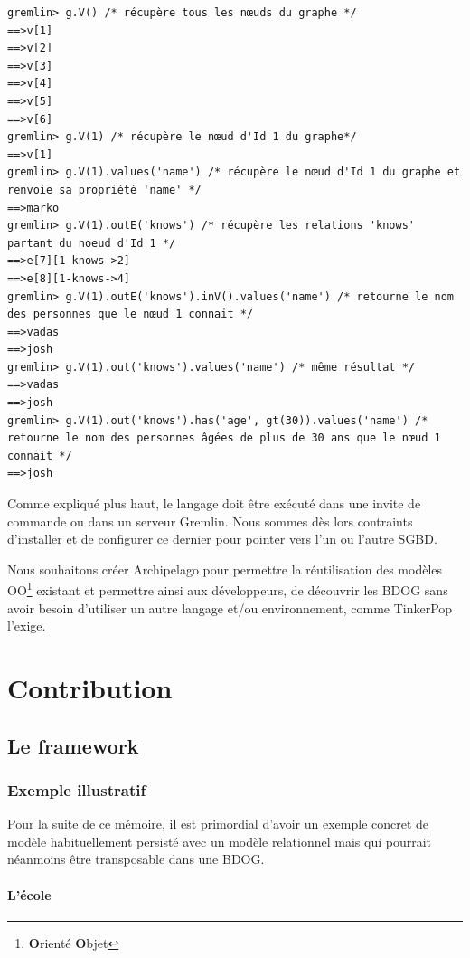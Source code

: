 \documentclass[a4paper,fleqn,12pt,oneside]{report}
\begin{document}
\begin{lstlisting}
gremlin> g.V() /* récupère tous les nœuds du graphe */
==>v[1]
==>v[2]
==>v[3]
==>v[4]
==>v[5]
==>v[6]
gremlin> g.V(1) /* récupère le nœud d'Id 1 du graphe*/
==>v[1]
gremlin> g.V(1).values('name') /* récupère le nœud d'Id 1 du graphe et renvoie sa propriété 'name' */
==>marko
gremlin> g.V(1).outE('knows') /* récupère les relations 'knows' partant du noeud d'Id 1 */
==>e[7][1-knows->2]
==>e[8][1-knows->4]
gremlin> g.V(1).outE('knows').inV().values('name') /* retourne le nom des personnes que le nœud 1 connait */
==>vadas
==>josh
gremlin> g.V(1).out('knows').values('name') /* même résultat */
==>vadas
==>josh
gremlin> g.V(1).out('knows').has('age', gt(30)).values('name') /* retourne le nom des personnes âgées de plus de 30 ans que le nœud 1 connait */
==>josh
\end{lstlisting}

Comme expliqué plus haut, le langage doit être exécuté dans une invite de commande ou dans un serveur Gremlin. Nous sommes dès lors contraints d’installer et de configurer ce dernier pour pointer vers l’un ou l’autre SGBD.

Nous souhaitons créer Archipelago pour permettre la réutilisation des modèles OO\footnote{\textbf{O}rienté \textbf{O}bjet} existant et permettre ainsi aux développeurs, de découvrir les BDOG sans avoir besoin d'utiliser un autre langage et/ou environnement, comme TinkerPop l'exige.



\part{Contribution}
\chapter{Le framework}
\section{Exemple illustratif}

Pour la suite de ce mémoire, il est primordial d'avoir un exemple concret de modèle habituellement persisté avec un modèle relationnel mais qui pourrait néanmoins être transposable dans une BDOG.

\subsection*{L'école}
\end{document}
